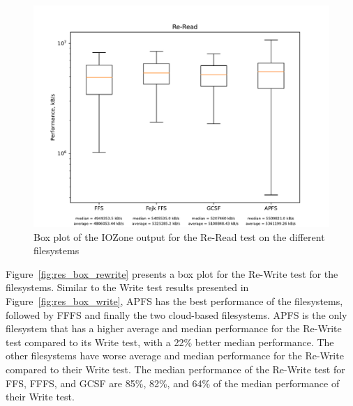 \begin{figure}[!ht]
	\label{fig:res_box_reread}
	\begin{center}
		\includegraphics[width=1.0\textwidth]{figures/benchmarking/Re-Read_box.pdf}
	\end{center}
	\caption{Box plot of the IOZone output for the Re-Read test on the different filesystems}
\end{figure}

\FloatBarrier

Figure~\ref{fig:res_box_rewrite} presents a box plot for the \mbox{Re-Write} test for the filesystems. Similar to the Write test results presented in Figure~\ref{fig:res_box_write}, \gls{APFS} has the best performance of the filesystems, followed by \gls{FFFS} and finally the two cloud-based filesystems. \gls{APFS} is the only filesystem that has a higher average and median performance for the \mbox{Re-Write} test compared to its Write test, with a 22\% better median performance. The other filesystems have worse average and median performance for the \mbox{Re-Write} compared to their Write test. The median performance of the \mbox{Re-Write} test for \gls{FFS}, \gls{FFFS}, and \gls{GCSF} are 85\%, 82\%, and 64\% of the median performance of their Write test. 

